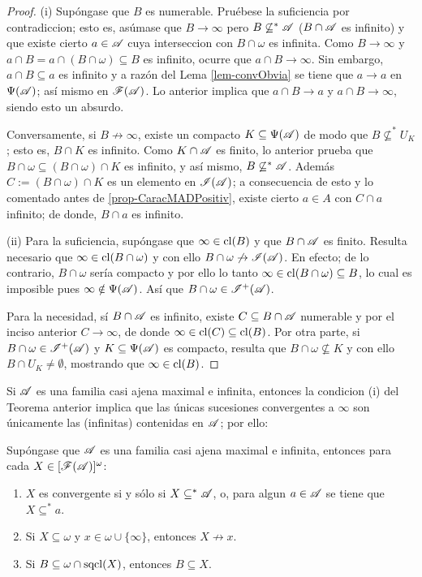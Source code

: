 	\begin{proof} 
		(i) Supóngase que $B$ es numerable. Pruébese la suficiencia por contradiccion; esto es, asúmase que $B \to \infty$ pero $B \not\subseteq^* \mathscr{A}$ ($B\cap \mathscr{A}$ es infinito) y que existe cierto $a \in \mathscr{A}$ cuya interseccion con $B \cap \omega$ es infinita. Como $B\to \infty$ y $a \cap B = a \cap (B \cap \omega) \subseteq B$ es infinito, ocurre que $a \cap B \to \infty$. Sin embargo, $a \cap B \subseteq a$ es infinito y a razón del Lema \ref{lem-convObvia} se tiene que $a \to a$ en $\Psi(\mathscr{A})$; así mismo en $\mathscr{F}(\mathscr{A})$. Lo anterior implica que $a \cap B \to a$ y $a \cap B \to \infty$, siendo esto un absurdo.

		Conversamente, si $B \not\to \infty$, existe un compacto $K \subseteq \Psi(\mathscr{A})$ de modo que $B \not\subseteq^* U_K$; esto es, $B \cap K$ es infinito. Como $K \cap \mathscr{A}$ es finito, lo anterior prueba que $B \cap \omega \subseteq (B \cap \omega) \cap K$ es infinito, y así mismo, $B \not\subseteq^* \mathscr{A}$. Además $C:=(B \cap \omega) \cap K$ es un elemento en $\mathscr{I}(\mathscr{A})$; a consecuencia de esto y lo comentado antes de \ref{prop-CaracMADPositiv}, existe cierto $a \in A$ con $C \cap a$ infinito; de donde, $B \cap a$ es infinito.
		
		(ii) Para la suficiencia, supóngase que $\infty \in \operatorname{cl}(B)$ y que $B \cap \mathscr{A}$ es finito. Resulta necesario que $\infty \in \operatorname{cl}(B \cap \omega)$ y con ello $B \cap \omega \not\to \mathscr{I}(\mathscr{A})$. En efecto; de lo contrario, $B \cap \omega$ sería compacto y por ello lo tanto $\infty \in \operatorname{cl}(B \cap \omega) \subseteq B$, lo cual es imposible pues $\infty \notin \Psi(\mathscr{A})$. Así que $B \cap \omega \in \mathscr{I}^+(\mathscr{A})$.

		Para la necesidad, sí $B \cap \mathscr{A}$ es infinito, existe $C \subseteq B \cap \mathscr{A}$ numerable y por el inciso anterior $C \to \infty$, de donde $\infty \in \operatorname{cl}(C) \subseteq \operatorname{cl}(B)$. Por otra parte, si $B \cap \omega \in \mathscr{I}^+(\mathscr{A})$ y $K \subseteq \Psi(\mathscr{A})$ es compacto, resulta que $B \cap \omega \not\subseteq K$ y con ello $B\cap U_K \neq \emptyset$, mostrando que $\infty \in \operatorname{cl}(B)$.
	\end{proof}

	Si $\mathscr{A}$ es una familia casi ajena maximal e infinita, entonces la condicion (i) del Teorema anterior implica que las únicas sucesiones convergentes a $\infty$ son únicamente las (infinitas) contenidas en $\mathscr{A}$; por ello:
	\begin{corolario}\label{cor-convMaximal}
		Supóngase que $\mathscr{A}$ es una familia casi ajena maximal e infinita, entonces para cada $X \in [\mathscr{F}(\mathscr{A})]^\omega$:
		\begin{enumerate}
			\item $X$ es convergente si y sólo si $X \subseteq^* \mathscr{A}$, o, para algun $a \in \mathscr{A}$ se tiene que $X \subseteq^* a$.
			\item Si $X \subseteq \omega$ y $x \in \omega \cup \{\infty\}$, entonces $X \not\to x$.
			\item Si $B \subseteq \omega \cap \operatorname{sqcl}(X)$, entonces $B \subseteq X$.
		\end{enumerate}
	\end{corolario}

